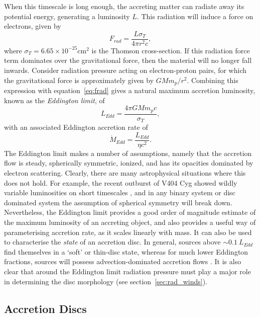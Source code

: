 When this timescale is long enough, the accreting matter
can radiate away its potential energy, generating a luminosity $L$. 
This radiation will induce a force on electrons, given by
\begin{equation}
F_{rad} = \frac{L \sigma_T}{4 \pi r^2 c},
\label{eq:frad}
\end{equation} 
where $\sigma_T = 6.65\times10^{-25}$cm$^2$ is the Thomson cross-section.
If this radiation force term dominates over the gravitational
force, then the material will no longer fall inwards. Consider
radiation pressure acting on electron-proton pairs, for which the gravitational
force is approximately given by $G M m_p / r^2$. Combining this expression
with equation~\ref{eq:frad} gives a natural
maximum accretion luminosity, known as the {\em Eddington limit}, of
\begin{equation}
L_{Edd} = \frac{4 \pi G M m_p c}{\sigma_T},
\label{eq:bondi}
\end{equation} 
with an associated Eddington accretion rate of 
\begin{equation}
\dot{M}_{Edd} = \frac{L_{Edd}}{\eta c^2}.
\label{eq:bondi}
\end{equation} 
The Eddington limit makes a number of assumptions, namely
that the accretion flow is steady, spherically symmetric, ionized,
and has its opacities dominated by electron scattering.
Clearly, there are many astrophysical situations where this does not hold.
For example, the recent outburst of V404 Cyg showed wildly variable
luminosities on short timescales 
\citep[see, e.g.,][among many, many ATels]{kuulkers_atel2015,motta_atel2015}, 
and in any binary system
or disc dominated system the assumption of spherical symmetry will
break down. Nevertheless, the Eddington limit provides a good order of magnitude 
estimate of the maximum luminosity of an accreting object,
and also provides a useful way of parameterising accretion rate,
as it scales linearly with mass. It can also be used
to characterise the {\em state} of an accretion disc.  
In general, sources above $\sim 0.1~L_{Edd}$ find themselves in a 
`soft' or thin-disc state, whereas for much lower Eddington 
fractions, sources will possess advection-dominated accretion flows
\citep[ADAFs; ][]{narayan1994,narayan1995}.
It is also clear that around the Eddington limit radiation pressure
must play a major role in determining the disc morphology 
(see section~\ref{sec:rad_winds}).

\subsection{Accretion Discs}

